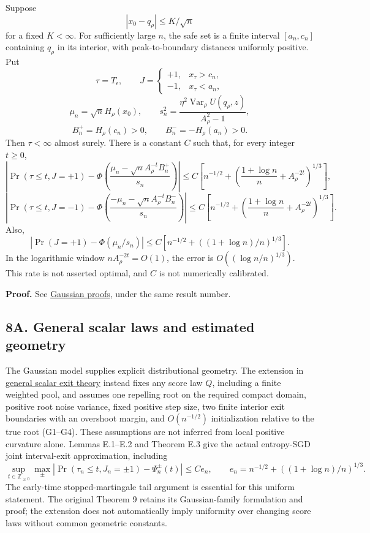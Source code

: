 Suppose \[
|x_0-q_\rho|\le K/\sqrt n
\] for a fixed \(K<\infty\). For sufficiently large \(n\), the safe set
is a finite interval \([a_n,c_n]\) containing \(q_\rho\) in its
interior, with peak-to-boundary distances uniformly positive. Put \[
\tau=T_\epsilon,\qquad
J=\begin{cases}+1,&x_\tau>c_n,\\-1,&x_\tau<a_n,\end{cases}
\] \[
\mu_n=\sqrt n H_\rho(x_0),\qquad
s_n^2=\frac{\eta^2\operatorname{Var}_\rho U(q_\rho,z)}{A_\rho^2-1},
\] \[
B_n^+=H_\rho(c_n)>0,\qquad B_n^-=-H_\rho(a_n)>0.
\] Then \(\tau<\infty\) almost surely. There is a constant \(C\) such
that, for every integer \(t\ge0\), \[
\left|\Pr(\tau\le t,J=+1)
-\Phi\!\left(\frac{\mu_n-\sqrt n A_\rho^{-t}B_n^+}{s_n}\right)\right|
\le C\left[n^{-1/2}+
\left(\frac{1+\log n}{n}+A_\rho^{-2t}\right)^{1/3}\right],
\] \[
\left|\Pr(\tau\le t,J=-1)
-\Phi\!\left(\frac{-\mu_n-\sqrt n A_\rho^{-t}B_n^-}{s_n}\right)\right|
\le C\left[n^{-1/2}+
\left(\frac{1+\log n}{n}+A_\rho^{-2t}\right)^{1/3}\right].
\] Also, \[
|\Pr(J=+1)-\Phi(\mu_n/s_n)|
\le C[n^{-1/2}+((1+\log n)/n)^{1/3}].
\] In the logarithmic window \(nA_\rho^{-2t}=O(1)\), the error is
\(O((\log n/n)^{1/3})\). This rate is not asserted optimal, and \(C\) is
not numerically calibrated.

\textbf{Proof.} See \href{gaussian_proofs.md}{Gaussian proofs}, under
the same result number.

\subsection{8A. General scalar laws and estimated
geometry}\label{draft-a.-general-scalar-laws-and-estimated-geometry}

The Gaussian model supplies explicit distributional geometry. The
extension in \href{scalar_exit.md}{general scalar exit theory} instead
fixes any score law \(Q\), including a finite weighted pool, and assumes
one repelling root on the required compact domain, positive root noise
variance, fixed positive step size, two finite interior exit boundaries
with an overshoot margin, and \(O(n^{-1/2})\) initialization relative to
the true root (G1--G4). These assumptions are not inferred from local
positive curvature alone. Lemmas E.1--E.2 and Theorem E.3 give the
actual entropy-SGD joint interval-exit approximation, including \[
\sup_{t\in\mathbb Z_{\ge0}}\max_\pm
|\Pr(\tau_n\le t,J_n=\pm1)-\Psi_n^\pm(t)|\le C e_n,
\qquad e_n=n^{-1/2}+((1+\log n)/n)^{1/3}.
\] The early-time stopped-martingale tail argument is essential for this
uniform statement. The original Theorem 9 retains its Gaussian-family
formulation and proof; the extension does not automatically imply
uniformity over changing score laws without common geometric constants.

